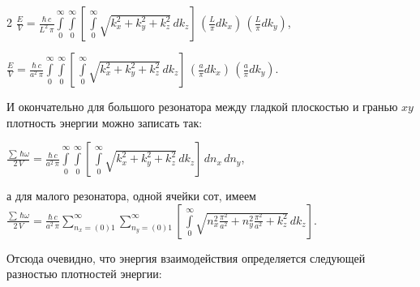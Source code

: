 \documentclass[twoside, 10pt]{article}
\begin{document}
\begin{multicols}{2}
\noindent
    \(\frac{E}{V} = \frac{\hbar\,c}{L^2\,\pi}\int\limits_{0}^{\infty}\int\limits_{0}^{\infty}\left[\,\int\limits_{0}^{\infty}\sqrt{k_x^2+k_y^2+k_z^2}\,dk_z\right]\,\left(\frac{L}{\pi}dk_x\right)\,\left(\frac{L}{\pi}dk_y\right)\),

\noindent
    \(\frac{E}{V} = \frac{\hbar\,c}{a^2\,\pi}\int\limits_{0}^{\infty}\int\limits_{0}^{\infty}\left[\,\int\limits_{0}^{\infty}\sqrt{k_x^2+k_y^2+k_z^2}\,dk_z\right]\,\left(\frac{a}{\pi}dk_x\right)\,\left(\frac{a}{\pi}dk_y\right)\).

И окончательно для большого резонатора между гладкой плоскостью и гранью \(xy\) плотность энергии можно записать так:

    \(\frac{\sum\,\hbar\omega}{2\,V} = \frac{\hbar\,c}{a^2\,\pi}\int\limits_{0}^{\infty}\int\limits_{0}^{\infty}\left[\,\int\limits_{0}^{\infty}\sqrt{k_x^2+k_y^2+k_z^2}\,dk_z\right]\,dn_x\,dn_y\),

а для малого резонатора, одной ячейки сот, имеем
\noindent
    \(\frac{\sum\,\hbar\omega}{2\,V} = \frac{\hbar\,c}{a^2\,\pi}\sum\limits_{n_x=(0)1}^{\infty}\sum\limits_{n_y=(0)1}^{\infty}\left[\,\int\limits_{0}^{\infty}\sqrt{n_x^2\frac{\pi^2}{a^2}+n_y^2\frac{\pi^2}{a^2}+k_z^2}\,dk_z\right]\).




Отсюда очевидно, что энергия взаимодействия определяется следующей разностью плотностей энергии:
\end{multicols}
\noindent
\end{document}
